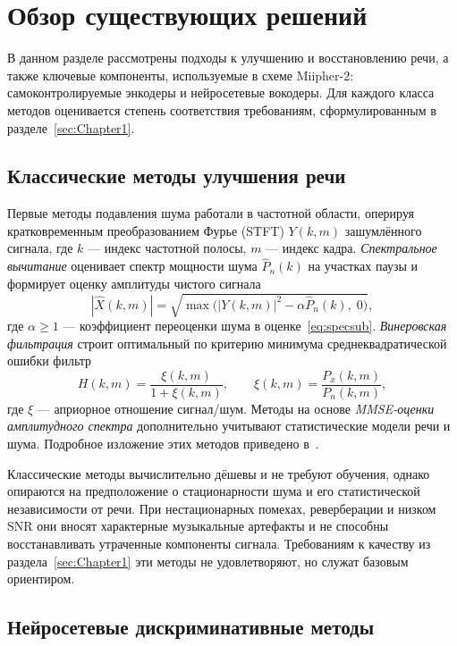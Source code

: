 \section{Обзор существующих решений}
\label{sec:Chapter2} 

В данном разделе рассмотрены подходы к улучшению и восстановлению речи, а также
ключевые компоненты, используемые в схеме Miipher-2: самоконтролируемые
энкодеры и нейросетевые вокодеры. Для каждого класса методов оценивается
степень соответствия требованиям, сформулированным в разделе~\ref{sec:Chapter1}.

\subsection{Классические методы улучшения речи}

Первые методы подавления шума работали в частотной области, оперируя
кратковременным преобразованием Фурье (STFT) $Y(k,m)$ зашумлённого сигнала, где
$k$ --- индекс частотной полосы, $m$ --- индекс кадра. \emph{Спектральное
вычитание} оценивает спектр мощности шума $\hat{P}_n(k)$ на участках паузы и
формирует оценку амплитуды чистого сигнала
\begin{equation}
    |\hat{X}(k,m)| = \sqrt{\max\!\big(|Y(k,m)|^2 - \alpha\hat{P}_n(k),\; 0\big)},
    \label{eq:specsub}
\end{equation}
где $\alpha\ge 1$ --- коэффициент переоценки шума в оценке~\eqref{eq:specsub}.
\emph{Винеровская фильтрация}
строит оптимальный по критерию минимума среднеквадратической ошибки фильтр
\begin{equation}
    H(k,m) = \frac{\xi(k,m)}{1 + \xi(k,m)},
    \qquad
    \xi(k,m) = \frac{P_x(k,m)}{P_n(k,m)},
    \label{eq:wiener}
\end{equation}
где $\xi$ --- априорное отношение сигнал/шум. Методы на основе \emph{MMSE-оценки
амплитудного спектра} дополнительно учитывают статистические модели речи и шума.
Подробное изложение этих методов приведено в~\cite{rabiner_shafer}.

Классические методы вычислительно дёшевы и не требуют обучения, однако опираются
на предположение о стационарности шума и его статистической независимости от
речи. При нестационарных помехах, реверберации и низком SNR они вносят
характерные музыкальные артефакты и не способны восстанавливать утраченные
компоненты сигнала. Требованиям к качеству из раздела~\ref{sec:Chapter1} эти
методы не удовлетворяют, но служат базовым ориентиром.

\subsection{Нейросетевые дискриминативные методы}

